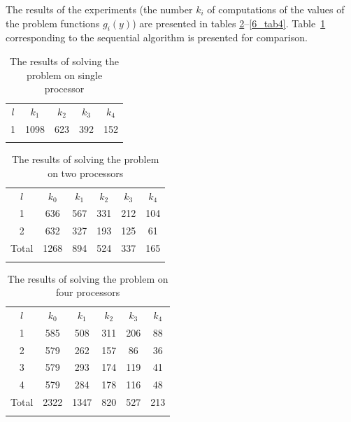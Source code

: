 The results of the experiments (the number $k_i$ of computations of the values of the problem functions $g_i(y)$) are presented in tables \ref{6_tab2}--\ref{6_tab4}. Table~\ref{6_tab1} corresponding to the sequential algorithm is presented for comparison. 

\begin{table}
	\caption{The results of solving the problem on single processor}
	\label{6_tab1}
	\center
	\begin{tabular}{ccccc}
		\hline\noalign{\smallskip}
		$l$  & $k_1$ & $k_2$ & $k_3$ & $k_4$    \\
		\noalign{\smallskip} \hline \noalign{\smallskip}
		1 	&	1098 &	623 & 392	& 152 \\
		\noalign{\smallskip}\hline
	\end{tabular}
\end{table}

\begin{table}
	\caption{The results of solving the problem on two processors}
	\label{6_tab2}
	\center
	\begin{tabular}{cccccc}
		\hline\noalign{\smallskip}
		$l$  & $k_0$ &$k_1$ & $k_2$ & $k_3$ & $k_4$    \\
		\noalign{\smallskip} \hline \noalign{\smallskip}
		1 	&	636 &	567 & 331	& 212 & 104 \\
		2 	&	632 &	327 & 193	& 125 & 61 \\
		\noalign{\smallskip}\hline\noalign{\smallskip}
		Total 	&	1268 &	894 & 524	& 337 & 165 \\
		\noalign{\smallskip}\hline
	\end{tabular}
\end{table}

\begin{table}
	\caption{The results of solving the problem on four processors}
	\label{6_tab3}
	\center
	\begin{tabular}{cccccc}
		\hline\noalign{\smallskip}
		$l$  & $k_0$ &$k_1$ & $k_2$ & $k_3$ & $k_4$    \\
		\noalign{\smallskip} \hline \noalign{\smallskip}
1	&	585	&	508	&	311	&	206	&	88	\\
2	&	579	&	262	&	157	&	86	&	36	\\
3	&	579	&	293	&	174	&	119	&	41	\\
4	&	579	&	284	&	178	&	116	&	48	\\
		\noalign{\smallskip}\hline\noalign{\smallskip}
		Total	&	2322	&	1347	&	820	&	527	&	213 \\
		\noalign{\smallskip}\hline
	\end{tabular}
\end{table}

